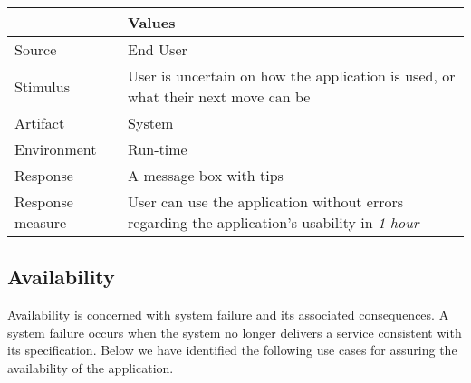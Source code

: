 \begin{itemize}
        \begin{tabular}{| l | p{7cm} |}
            \hline
            \rowcolor[gray]{0.8}
            \textbf{} & \textbf{Values} \\
            \hline
            Source & End User \\
            Stimulus & User is uncertain on how the application is used, or what their next move can be \\
            Artifact & System \\
            Environment & Run-time \\
            Response & A message box with tips \\
            Response measure  & User can use the application without errors regarding the application's usability in \emph{1 hour}\\
            \hline
        \end{tabular}
\end{itemize}

\subsection{Availability}
Availability is concerned with system failure and its associated consequences. A system failure occurs when the system no longer delivers a service consistent with its specification\citep{ProgarkPensum}. Below we have identified the following use cases for assuring the availability of the application.


